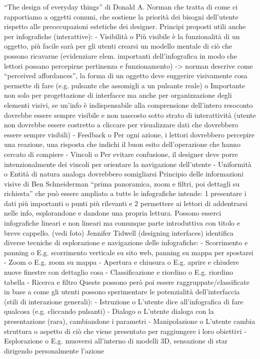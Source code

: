 “The design of everyday things” di Donald A. Norman che tratta di come ci rapportiamo a oggetti comuni, che sostiene la priorità dei bisogni dell'utente rispetto alle preoccupazioni estetiche dei designer. Principi proposti utili anche per infografiche (interattive):
-	Visibilità
o	Più visibile è la funzionalità di un oggetto, più facile sarà per gli utenti crearsi un modello mentale di ciò che possono ricavarne (evidenziare elem. importanti dell'infografica in modo che lettori possano percepirne pertinenza e funzionamento) -> norman descrive come “perceived affordances”, la forma di un oggetto deve suggerire visivamente cosa permette di fare (e.g. pulsante che assomigli a un pulsante reale)
o	Importante non solo per progettazione di interfacce ma anche per organizzazione degli elementi visivi, se un'info è indispensabile alla comprensione dell'intero resoconto dovrebbe essere sempre visibile e non nascosto sotto strato di interattività (utente non dovrebbe essere costretto a cliccare per visualizzare dati che dovrebbero essere sempre visibili)
-	Feedback
o	Per ogni azione, i lettori dovrebbero percepire una reazione, una risposta che indichi il buon esito dell'operazione che hanno cercato di compiere
-	Vincoli
o	Per evitare confusione, il designer deve porre intenzionalmente dei vincoli per orientare la navigazione dell'utente 
-	Uniformità
o	Entità di natura analoga dovrebbero somigliarsi
Principio delle informazioni visive di Ben Schneiderman “prima panoramica, zoom e filtri, poi dettagli su richiesta” che può essere ampliato a tutte le infografiche intende: 1 presentare i dati più importanti o punti più rilevanti e 2 permettere ai lettori di addentrarsi nelle info, esplorandone e dandone una propria lettura. Possono esserci infografiche lineari e non lineari ma comunque parte introduttiva con titolo e breve cappello. (vedi foto)
Jennifer Tidwell (designing interfaces) identifica diverse tecniche di esplorazione e navigazione delle infografiche:
-	Scorrimento e panning
o	E.g. scorrimento verticale su sito web, panning su mappa per spostarsi
-	Zoom
o	E.g. zoom su mappa
-	Apertura e chiusura
o	E.g. aprire e chiudere nuove finestre con dettaglio cosa 
-	Classificazione e riordino
o	E.g. riordino tabella
-	Ricerca e filtro
Queste possono però poi essere raggruppate/classificate in base a come gli utenti possono sperimentare le potenzialità dell'interfaccia (stili di interazione generali):
-	Istruzione
o	L'utente dice all'infografica di fare qualcosa (e.g. cliccando pulsanti)
-	Dialogo
o	L'utente dialoga con la presentazione (rara), cambiandone i parametri 
-	Manipolazione
o	L'utente cambia struttura o aspetto di ciò che viene presentato per raggiungere i loro obiettivi 
-	Esplorazione
o	E.g. muoversi all'interno di modelli 3D, sensazione di star dirigendo personalmente l'azione

